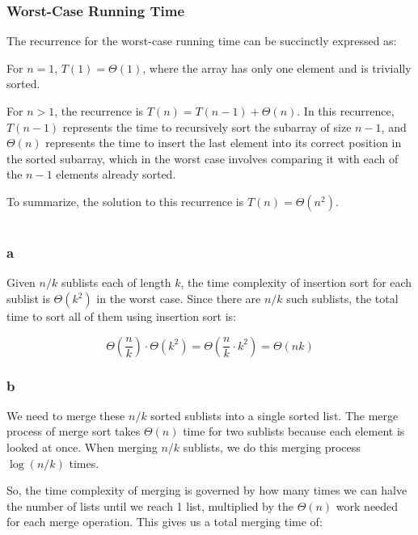 \documentclass{article}
\begin{document}
\subsubsection*{Worst-Case Running Time}

The recurrence for the worst-case running time can be succinctly expressed as:

For \(n = 1\), \(T(1) = \Theta(1)\), where the array has only one element and is trivially sorted. 

For \(n > 1\), the recurrence is \(T(n) = T(n-1) + \Theta(n)\).
In this recurrence, \(T(n-1)\) represents the time to recursively sort the subarray of size \(n-1\), and \(\Theta(n)\) represents the time to insert the last element into its correct position in the sorted subarray, which in the worst case involves comparing it with each of the \(n-1\) elements already sorted.

To summarize, the solution to this recurrence is \(T(n) = \Theta(n^2)\).

\section{}

\subsubsection*{a}

Given \(n/k\) sublists each of length \(k\), the time complexity of insertion sort for each sublist is \(\Theta(k^2)\) in the worst case. 
Since there are \(n/k\) such sublists, the total time to sort all of them using insertion sort is:

\[
\Theta\left(\frac{n}{k}\right) \cdot \Theta(k^2) = \Theta\left(\frac{n}{k} \cdot k^2\right) = \Theta(nk)
\]


\subsubsection*{b}

We need to merge these \(n/k\) sorted sublists into a single sorted list. The merge process of merge sort takes \(\Theta(n)\) time for two sublists because each element is looked at once. When merging \(n/k\) sublists, we do this merging process \(\log(n/k)\) times.

So, the time complexity of merging is governed by how many times we can halve the number of lists until we reach 1 list, multiplied by the \(\Theta(n)\) work needed for each merge operation. This gives us a total merging time of:
\end{document}
